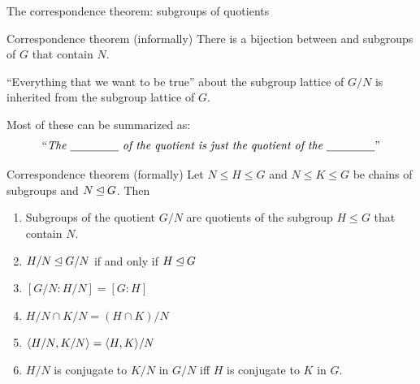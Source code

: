 \documentclass[8pt]{beamer}
\newcommand{\Pause}{}      %
\begin{document}

\begin{frame}{The correspondence theorem: subgroups of quotients} %

  \begin{alertblock}{Correspondence theorem (informally)}
    There is a bijection between  and
    {\color{blue}subgroups of $G$ that contain $N$}. \medskip\Pause
    
    ``Everything that we want to be true'' about the subgroup lattice of $G/N$ 
    is inherited from the subgroup lattice of $G$. \medskip\Pause
    
    Most of these can be summarized as: 
    \[
    \text{``\emph{The \underline{\hspace{15mm}} of the quotient is
        just the quotient of the \underline{\hspace{15mm}}}''}
    \]
  \end{alertblock}
  
  \begin{block}{Correspondence theorem (formally)}
    Let $N\leq H\leq G$ and $N\leq K\leq G$ be chains of subgroups and
    $N\unlhd G$. Then
    \begin{enumerate}
    \item Subgroups of the quotient $G/N$ are quotients of the
      subgroup $H\leq G$ that contain $N$.
    \item $H/N\unlhd G/N$ if and only if $H\unlhd G$
    \item $[G/N:H/N]=[G:H]$
    \item $H/N\cap K/N=(H\cap K)/N$
    \item $\langle H/N,K/N\rangle=\langle H,K\rangle/N$
    \item $H/N$ is conjugate to $K/N$ in $G/N$ iff $H$ is
      conjugate to $K$ in $G$.
    \end{enumerate}
  \end{block}
  
\end{frame}

\end{document}
